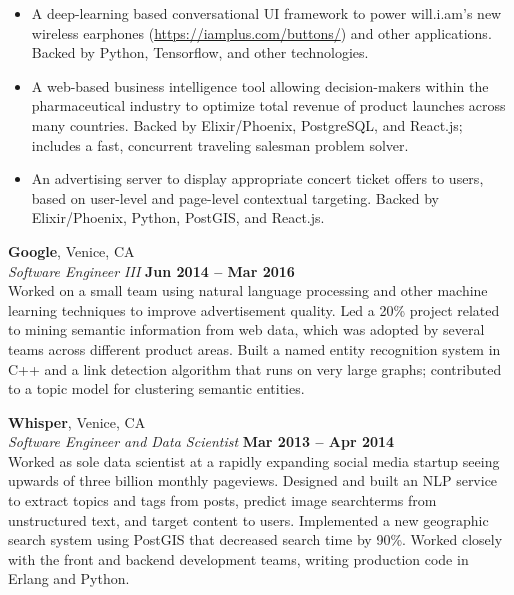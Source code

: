 \documentclass[margin,line]{resume}
\begin{document}
\begin{resume}
    \begin{itemize}
        \item A deep-learning based conversational UI framework to power will.i.am's new wireless earphones (\url{https://iamplus.com/buttons/}) and other applications. Backed by Python, Tensorflow, and other technologies.
        \item A web-based business intelligence tool allowing decision-makers within the pharmaceutical industry to optimize total revenue of product launches across many countries. Backed by Elixir/Phoenix, PostgreSQL, and React.js; includes a fast, concurrent traveling salesman problem solver.
        \item An advertising server to display appropriate concert ticket offers to users, based on user-level and page-level contextual targeting. Backed by Elixir/Phoenix, Python, PostGIS, and React.js.
    \end{itemize}

    \textbf{Google}, Venice, CA \vspace{2mm}\\\vspace{1mm}%
    \textsl{Software Engineer III} \hfill \textbf{Jun 2014 -- Mar 2016}\\
    Worked on a small team using natural language processing and other machine learning techniques to improve advertisement quality. Led a 20\% project related to mining semantic information from web data, which was adopted by several teams across different product areas. Built a named entity recognition system in C++ and a link detection algorithm that runs on very large graphs; contributed to a topic model for clustering semantic entities.

    \textbf{Whisper}, Venice, CA \vspace{2mm}\\\vspace{1mm}%
    \textsl{Software Engineer and Data Scientist} \hfill \textbf{Mar 2013 -- Apr 2014}\\
    Worked as sole data scientist at a rapidly expanding social media startup seeing upwards of three billion monthly pageviews. Designed and built an NLP service to extract topics and tags from posts, predict image searchterms from unstructured text, and target content to users. Implemented a new geographic search system using PostGIS that decreased search time by 90\%. Worked closely with the front and backend development teams, writing production code in Erlang and Python.


\end{resume}
\end{document}

